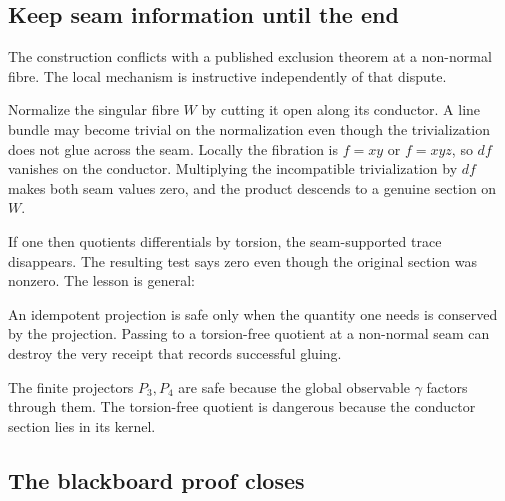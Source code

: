\documentclass[11pt,reqno]{amsart}
\numberwithin{equation}{section}
\theoremstyle{definition}
\begin{document}
\subsection{Keep seam information until the end}

The construction conflicts with a published exclusion theorem at a non-normal fibre. The local mechanism is instructive independently of that dispute.

Normalize the singular fibre $W$ by cutting it open along its conductor. A line bundle may become trivial on the normalization even though the trivialization does not glue across the seam. Locally the fibration is $f=xy$ or $f=xyz$, so $df$ vanishes on the conductor. Multiplying the incompatible trivialization by $df$ makes both seam values zero, and the product descends to a genuine section on $W$.

If one then quotients differentials by torsion, the seam-supported trace disappears. The resulting test says zero even though the original section was nonzero. The lesson is general:

\begin{center}
\begin{minipage}{0.88\textwidth}
An idempotent projection is safe only when the quantity one needs is conserved by the projection. Passing to a torsion-free quotient at a non-normal seam can destroy the very receipt that records successful gluing.
\end{minipage}
\end{center}

The finite projectors $P_3,P_4$ are safe because the global observable $\gamma$ factors through them. The torsion-free quotient is dangerous because the conductor section lies in its kernel.

\subsection{The blackboard proof closes}\label{sec:blackboard-close}
\end{document}
